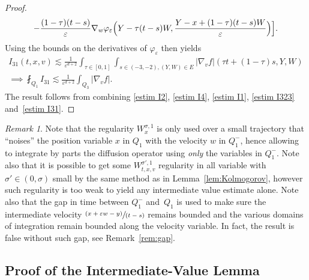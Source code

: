\documentclass[JEP,XML,SOM,Unicode,NoFloatCountersInSection,published]{cedram}
\newcommand{\pspfrac}[2]{\sfrac{(#1)}{(#2)}}
\theoremstyle{definition}
\theoremstyle{remark}
\newtheorem{remark}[theorem]{Remark}
\let\var\varepsilon
\begin{document}
\begin{proof}
\begin{multline*}
-\frac{(1-\tau)(t-s)}{\var}\nabla_w\varphi_\var
\Bigl(Y-\tau (t-s)W,\frac{Y-x+(1-\tau)(t-s)W}{\varepsilon}
\Bigr)\Bigr].
\end{multline*}
Using the bounds on the derivatives of $\varphi_\var$ then
yields
\begin{multline}
I_{31}(t,x,v) \lesssim \frac{1}{ \varepsilon^{d+2}}
\int_{\tau \in [0,1]}\int_{s\in
(-3,-2), (Y,W)\in E} |\nabla_v f|\left(\tau
t+(1-\tau)s,Y,W\right) \\
\implies
\label{estim I31}
\fint_{Q_1} I_{31} \lesssim
\frac{1}{ \varepsilon^{d+2}} \int_{Q_3} |\nabla_v f|.
\end{multline}
The result follows from combining \eqref{estim I2},
\eqref{estim I4}, \eqref{estim I1}, \eqref{estim I323}
and~\eqref{estim I31}.
\end{proof}

\begin{remark}
Note that the regularity $W^{\sigma,1}_{x}$ is only used over a
small trajectory that ``noises'' the position variable $x$ in
$Q_1$ with the velocity $w$ in $Q_1^-$, hence allowing to
integrate by parts the diffusion operator using \emph{only} the
variables in $Q_1^-$. Note also that it is possible to get some
$W^{\sigma',1}_{t,x,v}$ regularity in all variable with
$\sigma' \in (0,\sigma)$ small by the same method as in
Lemma~\ref{lem:Kolmogorov}, however such regularity is too weak
to yield any intermediate value estimate alone. Note also that
the gap in time between $Q_1^-$ and~$Q_1$ is used to make sure
the intermediate velocity $\pspfrac{x+\var w-y}{t-s}$ remains
bounded and the various domains of integration remain bounded
along the velocity variable. In fact, the result is false
without such gap, see Remark~\ref{rem:gap}.
\end{remark}

\subsection{Proof of the Intermediate-Value Lemma}
\label{ss:proof-ivl}
\end{document}

